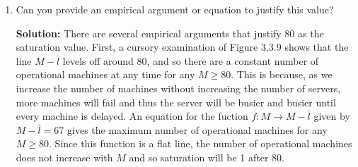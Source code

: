 \documentclass[11pt]{article} %
\begin{document}
\begin{enumerate}
\begin{enumerate}
\item Can you provide an empirical argument or equation to justify this value?

{\bf Solution:} There are several empirical arguments that justify 80 as the saturation value.  First, a cursory examination of Figure 3.3.9 shows that the line $M-\bar{l}$ levels off around 80, and so there are a constant number of operational machines at any time for any $M \ge 80$.  This is because, as we increase the number of machines without increasing the number of servers, more machines will fail and thus the server will be busier and busier until every machine is delayed.  An equation for the fuction $f: M \to M-\bar{l}$ given by $M-\bar{l} = 67$ gives the maximum number of operational machines for any $M\ge 80$.  Since this function is a flat line, the number of operational machines does not increase with $M$ and so saturation will be 1 after 80.

\end{enumerate}
\end{enumerate}
\end{document}
